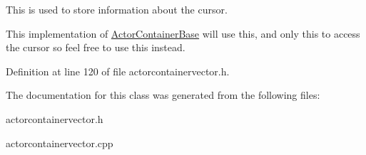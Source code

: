 This is used to store information about the cursor. 

This implementation of \hyperlink{classphys_1_1ActorContainerBase}{ActorContainerBase} will use this, and only this to access the cursor so feel free to use this instead. 

Definition at line 120 of file actorcontainervector.h.



The documentation for this class was generated from the following files:\begin{DoxyCompactItemize}
\item 
actorcontainervector.h\item 
actorcontainervector.cpp\end{DoxyCompactItemize}
